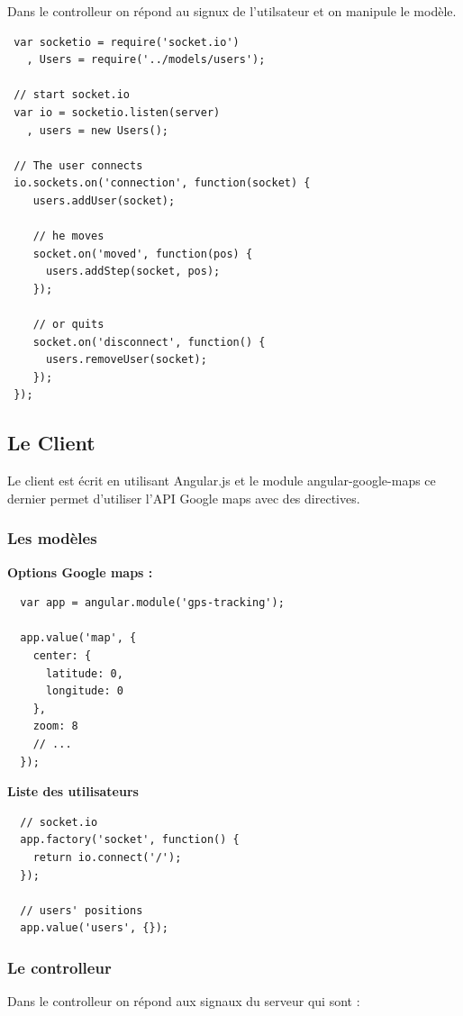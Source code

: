 \documentclass[a4paper]{article}
\begin{document}
Dans le controlleur on répond au signux de l'utilsateur et on manipule 
le modèle.

\begin{lstlisting}
 var socketio = require('socket.io')
   , Users = require('../models/users');

 // start socket.io
 var io = socketio.listen(server)
   , users = new Users();

 // The user connects
 io.sockets.on('connection', function(socket) {
    users.addUser(socket);
    
    // he moves
    socket.on('moved', function(pos) {
      users.addStep(socket, pos);
    });

    // or quits
    socket.on('disconnect', function() {
      users.removeUser(socket);
    });
 });
\end{lstlisting}

\subsection{Le Client}

Le client est écrit en utilisant Angular.js et le module angular-google-maps
ce dernier permet d'utiliser l'API Google maps avec des directives.

\subsubsection{Les modèles}

\textbf{Options Google maps : }
\begin{lstlisting}
  var app = angular.module('gps-tracking');

  app.value('map', {
    center: {
      latitude: 0,
      longitude: 0
    },
    zoom: 8
    // ...
  });
\end{lstlisting}
\textbf{Liste des utilisateurs}

\begin{lstlisting}
  // socket.io
  app.factory('socket', function() {
    return io.connect('/');
  });

  // users' positions
  app.value('users', {});
\end{lstlisting}

\subsubsection{Le controlleur}

Dans le controlleur on répond aux signaux du serveur qui sont : 
\end{document}

